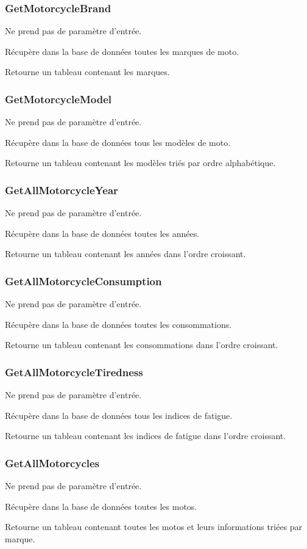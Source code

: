 \documentclass[a4paper]{article}
\begin{document}
\subsubsection{GetMotorcycleBrand}
Ne prend pas de paramètre d'entrée.

Récupère dans la base de données toutes les marques de moto.

Retourne un tableau contenant les marques.
\subsubsection{GetMotorcycleModel}
Ne prend pas de paramètre d'entrée.

Récupère dans la base de données tous les modèles de moto.

Retourne un tableau contenant les modèles triés par ordre alphabétique.
\subsubsection{GetAllMotorcycleYear}
Ne prend pas de paramètre d'entrée.

Récupère dans la base de données toutes les années.

Retourne un tableau contenant les années dans l'ordre croissant.
\subsubsection{GetAllMotorcycleConsumption}
Ne prend pas de paramètre d'entrée.

Récupère dans la base de données toutes les consommations.

Retourne un tableau contenant les consommations dans l'ordre croissant.
\subsubsection{GetAllMotorcycleTiredness}
Ne prend pas de paramètre d'entrée.

Récupère dans la base de données tous les indices de fatigue.

Retourne un tableau contenant les indices de fatigue dans l'ordre croissant.
\subsubsection{GetAllMotorcycles}
Ne prend pas de paramètre d'entrée.

Récupère dans la base de données toutes les motos.

Retourne un tableau contenant toutes les motos et leurs informations triées par marque. 
\end{document}
